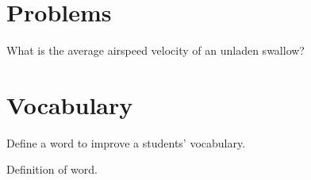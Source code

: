 
\section{Problems}

\begin{problem}
What is the average airspeed velocity of an unladen swallow?
\end{problem}


\section{Vocabulary}

Define a word to improve a students' vocabulary.

\begin{vocabulary}[Word]
Definition of word.
\end{vocabulary}

